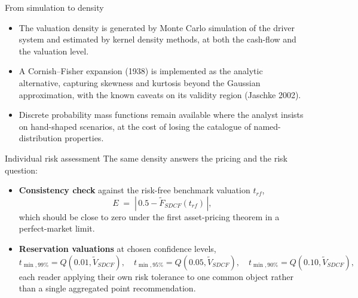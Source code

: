 \documentclass[aspectratio=169,11pt]{beamer}
\begin{document}
\begin{frame}{From simulation to density}
  \begin{itemize}
    \item The valuation density is generated by Monte Carlo simulation of
          the driver system and estimated by kernel density methods, at both
          the cash-flow and the valuation level.
    \item A Cornish--Fisher expansion (1938) is implemented as the analytic
          alternative, capturing skewness and kurtosis beyond the Gaussian
          approximation, with the known caveats on its validity region
          (Jaschke 2002).
    \item Discrete probability mass functions remain available where the
          analyst insists on hand-shaped scenarios, at the cost of losing
          the catalogue of named-distribution properties.
  \end{itemize}
\end{frame}

\begin{frame}{Individual risk assessment}
  \small The same density answers the pricing and the risk question:
  \begin{itemize}
    \item \textbf{Consistency check} against the risk-free benchmark
          valuation $t_{rf}$,
          \[ E \;=\; \left|\,0.5 - \tilde F_{SDCF}(t_{rf})\,\right|, \]
          which should be close to zero under the first asset-pricing
          theorem in a perfect-market limit.
    \item \textbf{Reservation valuations} at chosen confidence levels,
          \[ t_{\min,99\%} = Q(0.01,\tilde V_{SDCF}),\quad
             t_{\min,95\%} = Q(0.05,\tilde V_{SDCF}),\quad
             t_{\min,90\%} = Q(0.10,\tilde V_{SDCF}), \]
          each reader applying their own risk tolerance to one common
          object rather than a single aggregated point recommendation.
  \end{itemize}
\end{frame}
\end{document}
